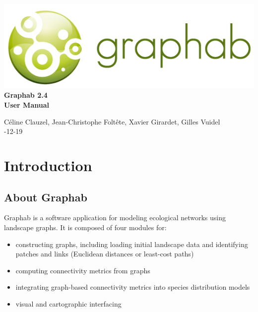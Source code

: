 \documentclass{article}
\begin{document}
\begin{titlepage}

	\centering
	\includegraphics[scale=0.5]{img/logo.png}\\
	
	\bigskip
	\bigskip
	\bigskip	
	{\Huge
	\bfseries
	Graphab 2.4\\
	\bigskip
	User Manual\\
	}
	\bigskip
	\bigskip
	\bigskip
	\bigskip
	\bigskip
			
	{\Large		
	Céline Clauzel, Jean-Christophe Foltête, Xavier Girardet, Gilles Vuidel\\
	-12-19\\
	}
	
\end{titlepage}

\setcounter{tocdepth}{2}
\tableofcontents

\pagebreak

\section{Introduction}

\subsection{About Graphab}

Graphab is a software application for modeling ecological networks using landscape graphs. It is composed of four modules for:
\begin{itemize}
	\item constructing graphs, including loading initial landscape data and identifying patches and links (Euclidean distances or least-cost paths)
	\item computing connectivity metrics from graphs
	\item integrating graph-based connectivity metrics into species distribution models
	\item visual and cartographic interfacing 
\end{itemize}
\end{document}
